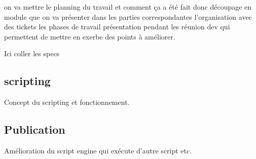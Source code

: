 on va mettre le planning du travail et comment ça a été fait
donc découpage en module que on va présenter dans les parties correspondantes
l'organisation avec des tickets
les phases de travail
présentation pendant les réunion dev qui permettent de mettre en exerbe des
points à améliorer.




Ici coller les specs

\subsection{scripting}

Concept du scripting et fonctionnement.




\subsection{Publication}

Amélioration du script engine qui exécute d'autre script etc.

